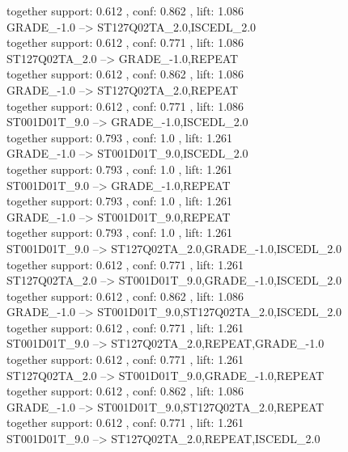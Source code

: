 \documentclass[12pt, a4paper, oneside]{ctexart}
\begin{document}
 together support: 0.612 , conf: 0.862 , lift: 1.086\\
GRADE\_-1.0 --> ST127Q02TA\_2.0,ISCEDL\_2.0 \\
 together support: 0.612 , conf: 0.771 , lift: 1.086\\
ST127Q02TA\_2.0 --> GRADE\_-1.0,REPEAT \\
 together support: 0.612 , conf: 0.862 , lift: 1.086\\
GRADE\_-1.0 --> ST127Q02TA\_2.0,REPEAT \\
 together support: 0.612 , conf: 0.771 , lift: 1.086\\
ST001D01T\_9.0 --> GRADE\_-1.0,ISCEDL\_2.0 \\
  together support: 0.793 , conf: 1.0 , lift: 1.261\\
GRADE\_-1.0 --> ST001D01T\_9.0,ISCEDL\_2.0\\ 
  together support: 0.793 , conf: 1.0 , lift: 1.261\\
ST001D01T\_9.0 --> GRADE\_-1.0,REPEAT \\
  together support: 0.793 , conf: 1.0 , lift: 1.261\\
GRADE\_-1.0 --> ST001D01T\_9.0,REPEAT \\
  together support: 0.793 , conf: 1.0 , lift: 1.261\\
ST001D01T\_9.0 --> ST127Q02TA\_2.0,GRADE\_-1.0,ISCEDL\_2.0\\ 
 together support: 0.612 , conf: 0.771 , lift: 1.261\\
ST127Q02TA\_2.0 --> ST001D01T\_9.0,GRADE\_-1.0,ISCEDL\_2.0 \\
 together support: 0.612 , conf: 0.862 , lift: 1.086\\
GRADE\_-1.0 --> ST001D01T\_9.0,ST127Q02TA\_2.0,ISCEDL\_2.0\\ 
 together support: 0.612 , conf: 0.771 , lift: 1.261\\
ST001D01T\_9.0 --> ST127Q02TA\_2.0,REPEAT,GRADE\_-1.0 \\
 together support: 0.612 , conf: 0.771 , lift: 1.261\\
ST127Q02TA\_2.0 --> ST001D01T\_9.0,GRADE\_-1.0,REPEAT \\
 together support: 0.612 , conf: 0.862 , lift: 1.086\\
GRADE\_-1.0 --> ST001D01T\_9.0,ST127Q02TA\_2.0,REPEAT \\
 together support: 0.612 , conf: 0.771 , lift: 1.261\\
ST001D01T\_9.0 --> ST127Q02TA\_2.0,REPEAT,ISCEDL\_2.0 \\
\end{document}
